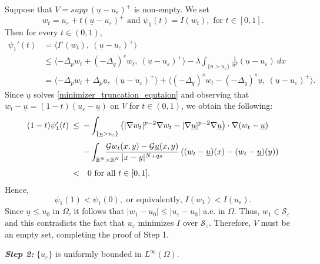 \documentclass[reqno,oneside]{amsart}
\theoremstyle{definition}
\theoremstyle{remark}
\numberwithin{equation}{section}
\newcommand{\Om} {\Omega}
\newcommand{\sr}{\mathbb{R}}
\newcommand{\p}{\Delta_p}
\newcommand{\qs}{(-\Delta_q)^s}
\newcommand{\na} {\nabla}
\newcommand{\ul}{\underline{u}}
\newcommand{\la} {\lambda}
\begin{document}
Suppose that $V= supp\ (\ul - u_{\varepsilon})^+$ is non-empty. We set
\[w_t = u_{\varepsilon} + t(\ul - u_{\varepsilon})^+ \text{ and } \psi_1 (t) = I (w_t), \text{ for } t\in [0,1]. \]
Then for every $t\in (0,1)$, 
\begin{align*}
    \psi_1' (t) &= \langle I' (w_t),\ (\ul - u_{\varepsilon})^+ \rangle\\
    &\leq \langle -\p w_t + \qs w_t,\ (\ul - u_{\varepsilon})^+ \rangle - \la \int_{\{ \ul > u_{\varepsilon}\}} \frac{1}{\ul^{\delta}} (\ul - u_{\varepsilon})\ dx\\
    &=  \langle -\p w_t + \p \ul,\ (\ul - u_{\varepsilon})^+ \rangle + \langle \qs w_t - \qs \ul,\ (\ul - u_{\varepsilon})^+ \rangle.
\end{align*}
Since $\ul$ solves \eqref{minimizer_truncation_equtaion} and observing that $w_t - \ul = (1-t) (u_{\varepsilon} - \ul) $ on $V$ for $t\in (0,1)$, we obtain the following: 
$$\begin{array}{lll}
    (1-t) \psi_1'(t) &\hspace{-5pt}\leq &\hspace{-5pt} - \displaystyle \int_{\{\ul > u_{\varepsilon}\}} \left( |\na w_t|^{p-2} \na w_t - |\na \ul|^{p-2} \na \ul \right) \cdot \na (w_t - \ul)\\[5mm]
    &\hspace{-5pt} &\hspace{-5pt} - \displaystyle \int_{\sr^N \times \sr^N} \hspace{-20pt}\frac{\mathcal{G}w_t (x,y) - \mathcal{G}\ul (x,y)}{|x-y|^{N+qs}} \left( (w_t - \ul) (x) - (w_t - \ul) (y) \right)\\[5mm]
    & \hspace{-5pt} < & 0 \mbox{ for all } t\in [0,1].
\end{array}
$$
Hence, 
\[\psi_1(1) < \psi_1(0), \text{ or equivalently, } I (w_1) < I (u_{\varepsilon}).\]
Since $\ul \leq u_0$ in $\Om$, it follows that $|w_1 - u_0| \leq |u_{\varepsilon} - u_0|$ a.e. in $\Om$. Thus, $w_1 \in \mathcal{S}_{\varepsilon}$ and this contradicts the fact that $u_{\varepsilon}$ minimizes $I$ over $\mathcal{S}_{\varepsilon}$. Therefore, $V$ must be an empty set, completing the proof of Step 1.
\vspace{5pt}

\noindent\textit{\textbf{Step 2:}} $\{ u_{\varepsilon} \}$ is uniformly bounded in $L^{\infty} (\Om)$.
\vspace{5pt}
\end{document}
